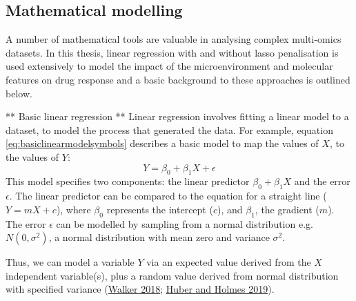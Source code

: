 \documentclass[11pt, a4paper, twosided]{book}
\begin{document}
\hypertarget{intro-multivariate-modelling}{%
\subsection{Mathematical modelling}\label{intro-multivariate-modelling}}

A number of mathematical tools are valuable in analysing complex multi-omics datasets. In this thesis, linear regression with and without lasso penalisation is used extensively to model the impact of the microenvironment and molecular features on drug response and a basic background to these approaches is outlined below.

** Basic linear regression **
Linear regression involves fitting a linear model to a dataset, to model the process that generated the data. For example, equation \eqref{eq:basiclinearmodelsymbols} describes a basic model to map the values of \(X\), to the values of \(Y\):
\begin{equation}
            Y = \beta_{0} + \beta_{1}X  + \epsilon
                                       \label{eq:basiclinearmodelsymbols}
    \end{equation}
This model specifies two components: the linear predictor \(\beta_{0} + \beta_{1}X\) and the error \(\epsilon\). The linear predictor can be compared to the equation for a straight line (\(Y = mX + c\)), where \(\beta_{0}\) represents the intercept (\(c\)), and \(\beta_{1}\), the gradient (\(m\)). The error \(\epsilon\) can be modelled by sampling from a normal distribution e.g.~\(N(0,\sigma^2)\), a normal distribution with mean zero and variance \(\sigma^2\).

Thus, we can model a variable \(Y\) via an expected value derived from the \(X\) independent variable(s), plus a random value derived from normal distribution with specified variance (\protect\hyperlink{ref-Walker2018}{Walker 2018}; \protect\hyperlink{ref-Huber2019}{Huber and Holmes 2019}).
\end{document}
